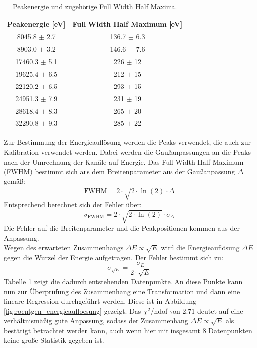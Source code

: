 \documentclass[12pt,a4paper]{article}
\begin{document}
\begin{table}
\centering
\begin{tabular}{|c|c|}
\hline 
Peakenergie [\si{eV}] & Full Width Half Maximum [\si{eV}] \\ 
\hline 
8045.8 $\pm$ 2.7 & 136.7 $\pm$ 6.3 \\ 
\hline
8903.0 $\pm$ 3.2 & 146.6 $\pm$ 7.6 \\ 
\hline
17460.3 $\pm$ 5.1 & 226 $\pm$ 12 \\ 
\hline
19625.4 $\pm$ 6.5 & 212 $\pm$ 15 \\ 
\hline
22120.2 $\pm$ 6.5 & 293 $\pm$ 15 \\ 
\hline
24951.3 $\pm$ 7.9 & 231 $\pm$ 19 \\ 
\hline
28618.4 $\pm$ 8.3 & 265 $\pm$ 20 \\ 
\hline
32290.8 $\pm$ 9.3 & 285 $\pm$ 22 \\ 
\hline
\end{tabular} 
\caption{Peakenergie und zugehörige Full Width Half Maxima.}
\label{tab:roentgen_energieaufloesung}
\end{table}

Zur Bestimmung der Energieauflösung werden die Peaks verwendet, die auch zur Kalibration verwendet werden. Dabei werden die Gaußanpassungen an die Peaks nach der Umrechnung der Kanäle auf Energie. Das Full Width Half Maximum (FWHM) bestimmt sich aus dem Breitenparameter aus der Gaußanpassung $\Delta$ gemäß:
\begin{equation*}
\textrm{FWHM} = 2 \cdot \sqrt{2 \cdot \ln(2)} \cdot \Delta
\end{equation*}
Entsprechend berechnet sich der Fehler über:
\begin{equation*}
\sigma _\textrm{FWHM} = 2 \cdot \sqrt{2 \cdot \ln(2)} \cdot \sigma _\Delta
\end{equation*}
Die Fehler auf die Breitenparameter und die Peakpositionen kommen aus der Anpassung. \\
Wegen des erwarteten Zusammenhangs $\Delta E \propto \sqrt{E}$ wird die Energieauflösung $\Delta E$ gegen die Wurzel der Energie aufgetragen. Der Fehler bestimmt sich zu:
\begin{equation*}
\sigma _{\sqrt{E}} = \dfrac{\sigma _E}{2 \cdot \sqrt{E}}
\end{equation*}
Tabelle \ref{tab:roentgen_energieaufloesung} zeigt die dadurch entstehenden Datenpunkte. An diese Punkte kann nun zur Überprüfung des Zusammenhang eine Transformation und dann eine lineare Regression durchgeführt werden. Diese ist in Abbildung \ref{fig:roentgen_energieaufloesung} gezeigt. Das $\chi ^2$/ndof von 2.71 deutet auf eine verhältnismäßig gute Anpassung, sodass der Zusammenhang $\Delta E \propto \sqrt{E}$ als bestätigt betrachtet werden kann, auch wenn hier mit insgesamt 8 Datenpunkten keine große Statistik gegeben ist.
\end{document}
